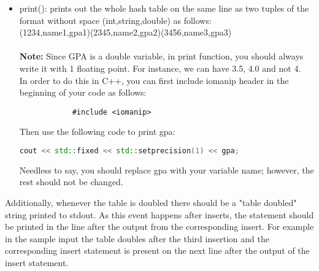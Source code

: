 \documentclass[times, 12pt]{article}
\begin{document}
\begin{itemize}
\begin{itemize}
        \item print(): prints out the whole hash table on the same line as two tuples of the format without space (int,string,double) as follows:\\
        (1234,name1,gpa1)(2345,name2,gpa2)(3456,name3,gpa3)\\\\
        \textbf{Note:} Since GPA is a double variable, in print function, you should always write it with 1 floating point. For instance, we can have 3.5, 4.0 and not 4.\\
        In order to do this in C++, you can first include iomanip header in the beginning of your code as follows:
        \begin{lstlisting}
            #include <iomanip>
        \end{lstlisting}
        
        Then use the following code to print gpa:
        
        \begin{lstlisting}[language=C++,
            directivestyle={\color{black}}
            emph={int,char,double,float,unsigned},
            emphstyle={\color{green}}
            ]
            cout << std::fixed << std::setprecision(1) << gpa;
        \end{lstlisting}
            
        Needless to say, you should replace gpa with your variable name; however, the rest should not be changed.
    \end{itemize}
\end{itemize}

Additionally, whenever the table is doubled there should be a "table doubled" string printed to stdout. As
this event happens after inserts, the statement should be printed in the line after the output from
the corresponding insert. For example in the sample input the table doubles after the third
insertion and the corresponding insert statement is present on the next line after the output of the insert statement.
\end{document}
